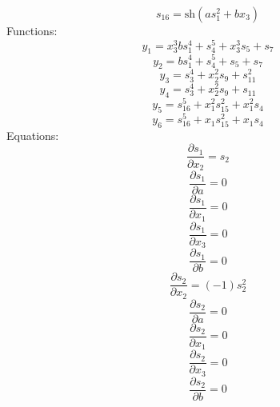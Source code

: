 \documentclass[10pt,a4paper]{article}
\begin{document}
\begin{dmath*}s_{16} = \text{sh}\left(a  s_{1} ^ {2} + b  x_{3}\right)\end{dmath*}
Functions:
\begin{dmath*}y_{1} = x_{3} ^ {3}  b  s_{1} ^ {4} + s_{4} ^ {5} + x_{3} ^ {3}  s_{5} + s_{7}\end{dmath*}
\begin{dmath*}y_{2} = b  s_{1} ^ {4} + s_{4} ^ {5} + s_{5} + s_{7}\end{dmath*}
\begin{dmath*}y_{3} = s_{3} ^ {4} + x_{2} ^ {2}  s_{9} + s_{11} ^ {2}\end{dmath*}
\begin{dmath*}y_{4} = s_{3} ^ {4} + x_{2} ^ {2}  s_{9} + s_{11}\end{dmath*}
\begin{dmath*}y_{5} = s_{16} ^ {5} + x_{1} ^ {2}  s_{15} ^ {2} + x_{1} ^ {2}  s_{4}\end{dmath*}
\begin{dmath*}y_{6} = s_{16} ^ {5} + x_{1}  s_{15} ^ {2} + x_{1}  s_{4}\end{dmath*}
Equations:
\begin{dmath*}\frac{\partial s_{1}}{\partial x_{2}} = s_{2}\end{dmath*}
\begin{dmath*}\frac{\partial s_{1}}{\partial a} = 0\end{dmath*}
\begin{dmath*}\frac{\partial s_{1}}{\partial x_{1}} = 0\end{dmath*}
\begin{dmath*}\frac{\partial s_{1}}{\partial x_{3}} = 0\end{dmath*}
\begin{dmath*}\frac{\partial s_{1}}{\partial b} = 0\end{dmath*}
\begin{dmath*}\frac{\partial s_{2}}{\partial x_{2}} = \left(-1\right)  s_{2} ^ {2}\end{dmath*}
\begin{dmath*}\frac{\partial s_{2}}{\partial a} = 0\end{dmath*}
\begin{dmath*}\frac{\partial s_{2}}{\partial x_{1}} = 0\end{dmath*}
\begin{dmath*}\frac{\partial s_{2}}{\partial x_{3}} = 0\end{dmath*}
\begin{dmath*}\frac{\partial s_{2}}{\partial b} = 0\end{dmath*}
\end{document}
